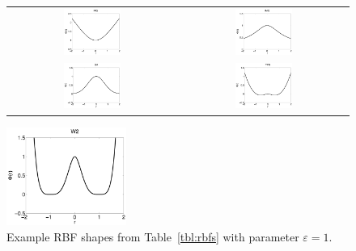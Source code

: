 \begin{figure}[t]
\centering
\begin{tabular}{cc}
\includegraphics[width=0.35\textwidth]{matlab/mq_rbf.pdf} & \includegraphics[width=0.35\textwidth]{matlab/imq_rbf.pdf} \\
\includegraphics[width=0.35\textwidth]{matlab/ga_rbf.pdf} & \includegraphics[width=0.35\textwidth]{matlab/tps_rbf.pdf} \\
\end{tabular}
\includegraphics[width=0.35\textwidth]{matlab/w2_rbf.pdf}
\caption{Example RBF shapes from Table~\ref{tbl:rbfs} with parameter $\varepsilon=1$.}
\label{fig:rbf_examples}
\end{figure} 